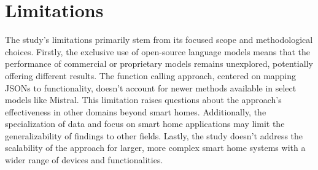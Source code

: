 \section{Limitations}
The study's limitations primarily stem from its focused scope and methodological choices. 
Firstly, the exclusive use of open-source language models means that the performance of commercial or proprietary models remains unexplored, potentially offering different results. 
The function calling approach, centered on mapping JSONs to functionality, doesn't account for newer methods available in select models like Mistral. This limitation raises questions about the approach's effectiveness in other domains beyond smart homes. 
Additionally, the specialization of data and focus on smart home applications may limit the generalizability of findings to other fields. 
Lastly, the study doesn't address the scalability of the approach for larger, more complex smart home systems with a wider range of devices and functionalities.

